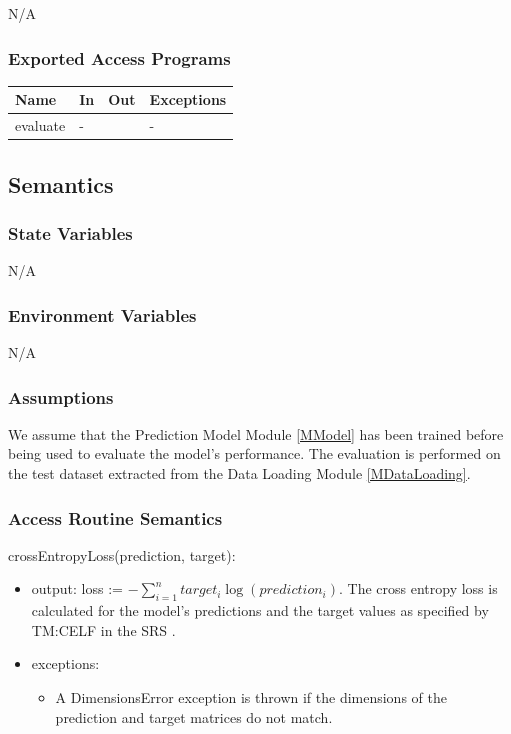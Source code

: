 \documentclass[12pt, titlepage]{article}
\begin{document}
N/A

\subsubsection{Exported Access Programs}

\begin{center}
\begin{tabular}{p{4cm} p{4cm} p{4cm} p{2cm}}
\hline
\textbf{Name} & \textbf{In} & \textbf{Out} & \textbf{Exceptions} \\
\hline
evaluate & -  &  & - \\
\hline
\end{tabular}
\end{center}

\subsection{Semantics}

\subsubsection{State Variables}

N/A

\subsubsection{Environment Variables}

N/A

\subsubsection{Assumptions}

We assume that the Prediction Model Module \ref{MModel} has been trained
before being used to evaluate the model's performance. The evaluation is
performed on the test dataset extracted from the Data Loading Module
\ref{MDataLoading}.

\subsubsection{Access Routine Semantics}

\noindent crossEntropyLoss(prediction, target):
\begin{itemize}
\item output: loss := $- \sum_{i=1}^{n} target_i \log(prediction_i)$. The cross
entropy loss is calculated for the model's predictions and the target values
as specified by TM:CELF in the SRS \cite[4.2.2]{SRS}.
\item exceptions:
\begin{itemize}
  \item A DimensionsError exception is thrown if the dimensions of the prediction
  and target matrices do not match.
\end{itemize}
\end{itemize}
\end{document}
